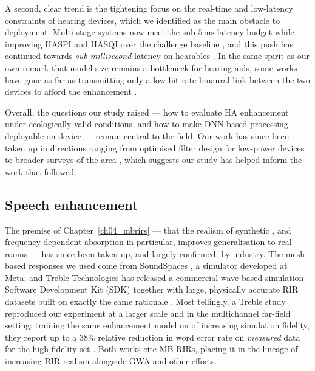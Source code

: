 A second, clear trend is the tightening focus on the real-time and low-latency
constraints of hearing devices, which we identified as the main obstacle to
deployment. Multi-stage systems now meet the sub-$5\,\text{ms}$ latency budget
while improving \acrshort{HASPI} and \acrshort{HASQI} over the challenge baseline
\citep{multistage2023lowlatency}, and this push has continued towards
\emph{sub-millisecond} latency on hearables \citep{dementyev2024submillisecond}.
In the same spirit as our own remark that model size remains a bottleneck for
hearing aids, some works have gone as far as transmitting only a low-bit-rate
binaural link between the two devices to afford the enhancement
\citep{westhausen2023lowbitrate}.

Overall, the questions our study raised --- how to evaluate \acrshort{HA}
enhancement under ecologically valid conditions, and how to make
\acrshort{DNN}-based processing deployable on-device --- remain central to the
field. Our work has since been taken up in directions ranging from optimised
filter design for low-power devices \citep{rawandale2024improving} to
broader surveys of the area \citep{jespersen2023hearing, kanev2024speech, cao2025aecrn}, which
suggests our study has helped inform the work that followed.

\subsection{Speech enhancement}
\label{ssec:conc_se}

The premise of Chapter~\ref{ch04_mbrirs} --- that the realism of synthetic
, and frequency-dependent absorption in particular, improves
generalisation to real rooms --- has since been taken up, and largely confirmed,
by industry. The mesh-based responses we used come from SoundSpaces
\citep{chen2022soundspaces}, a simulator developed at Meta; and Treble
Technologies has released a commercial wave-based simulation Software Development Kit (SDK)
together with large, physically accurate \acrshort{RIR} datasets built on exactly
the same rationale \citep{mullins2025treble10}. Most tellingly, a Treble study
reproduced our experiment at a larger scale and in the multichannel far-field
setting: training the same enhancement model on  of increasing
simulation fidelity, they report up to a $38\%$ relative reduction in word error
rate on \emph{measured} data for the high-fidelity set
\citep{gotz2026improving}. Both works cite MB-RIRs, placing it in
the lineage of increasing \acrshort{RIR} realism alongside GWA
\citep{tang2022gwa} and other efforts.

